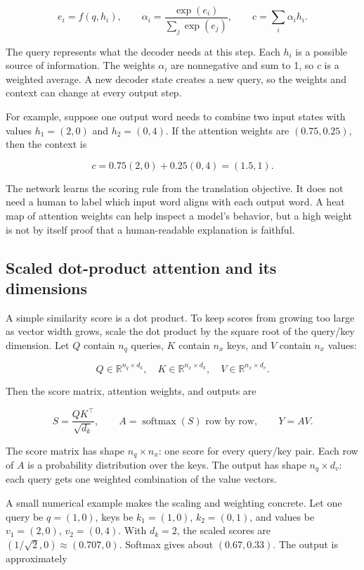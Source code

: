 \[
e_i=f(q,h_i),\qquad
\alpha_i=\frac{\exp(e_i)}{\sum_j\exp(e_j)},\qquad
c=\sum_i\alpha_i h_i.
\]

The query represents what the decoder needs at this step. Each \(h_i\) is a possible source of information. The weights \(\alpha_i\) are nonnegative and sum to 1, so \(c\) is a weighted average. A new decoder state creates a new query, so the weights and context can change at every output step.

For example, suppose one output word needs to combine two input states with values \(h_1=(2,0)\) and \(h_2=(0,4)\). If the attention weights are \((0.75,0.25)\), then the context is

\[
c=0.75(2,0)+0.25(0,4)=(1.5,1).
\]

The network learns the scoring rule from the translation objective. It does not need a human to label which input word aligns with each output word. A heat map of attention weights can help inspect a model's behavior, but a high weight is not by itself proof that a human-readable explanation is faithful.

\subsection{Scaled dot-product attention and its dimensions}\label{04-visual-computing-ii-ch031-scaled-dot-product-attention-and-its-dimensions}

\hypertarget{04-visual-computing-ii-ch031-scaled-dot-product-attention-and-its-dimensions}{}

A simple similarity score is a dot product. To keep scores from growing too large as vector width grows, scale the dot product by the square root of the query/key dimension. Let \(Q\) contain \(n_q\) queries, \(K\) contain \(n_x\) keys, and \(V\) contain \(n_x\) values:

\[
Q\in\mathbb{R}^{n_q\times d_k},\quad
K\in\mathbb{R}^{n_x\times d_k},\quad
V\in\mathbb{R}^{n_x\times d_v}.
\]

Then the score matrix, attention weights, and outputs are

\[
S=\frac{QK^\top}{\sqrt{d_k}},\qquad
A=\operatorname{softmax}(S)\text{ row by row},\qquad
Y=AV.
\]

The score matrix has shape \(n_q\times n_x\): one score for every query/key pair. Each row of \(A\) is a probability distribution over the keys. The output has shape \(n_q\times d_v\): each query gets one weighted combination of the value vectors.

A small numerical example makes the scaling and weighting concrete. Let one query be \(q=(1,0)\), keys be \(k_1=(1,0)\), \(k_2=(0,1)\), and values be \(v_1=(2,0)\), \(v_2=(0,4)\). With \(d_k=2\), the scaled scores are \((1/\sqrt2,0)\approx(0.707,0)\). Softmax gives about \((0.67,0.33)\). The output is approximately


